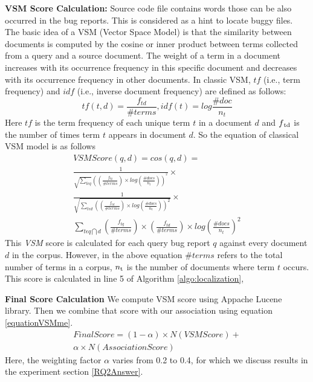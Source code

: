 \documentclass[conference]{IEEEtran}
\begin{document}
\textbf{VSM Score Calculation:}
Source code file contains words those can be also occurred in the bug reports. This is considered as a hint to locate buggy files. 
The basic idea of a VSM (Vector Space Model) is that the similarity between documents is computed by the cosine or inner product between terms collected from a query and a source document.
The weight of a term in a document increases with its occurrence frequency in this specific document and decreases with its occurrence frequency in other documents.
In classic VSM, {$tf$} (i.e., term frequency) and {$idf$} (i.e., inverse document frequency) are defined as follows:
\begin{equation}
tf(t,d)=\frac{f_{td}}{\#terms}, idf(t)=log\frac{\#doc}{n_{t}}
\end{equation}
Here $tf$ is the term frequency of each unique term {$t$} in a document {$d$} and {$f\textsubscript{td}$} is the number of times term {$t$} appears in document {$d$}.
So the equation of classical VSM model is as follows
\begin{multline}\label{VSMequation}
VSMScore(q,d)= cos(q,d) =
\\
\frac{1}{\sqrt{\sum_{t\epsilon q}}((\frac{f_{tq}}{\#terms})\times log(\frac{\#docs}{n_{t}}))^{^{2}}}\times 
\\
\frac{1}{\sqrt{\sum_{t\epsilon d}((\frac{f_{td}}{\#terms})\times log(\frac{\#docs}{n_{t}}))^{2}}}\times
\\
\sum_{t\epsilon q\bigcap d}(\frac{f_{tq}}{\#terms})\times (\frac{f_{td}}{\#terms})\times log(\frac{\#docs}{n_{t}})^{2}
\end{multline}
This \textit{VSM} score is calculated for each query bug report {$q$} against every document {$d$} in the corpus. However, in the above equation {$\#terms$} refers to the total number of terms in a corpus, {$n\textsubscript{t}$} is the number of documents where term {$t$} occurs. This score is calculated in line 5 of Algorithm \ref{algo:localization},




\textbf{Final Score Calculation}
We compute VSM score using Appache Lucene library. Then we combine that score with our association using equation \ref{equationVSMme}.
\begin{multline}\label{equationVSMme}
FinalScore=(1-\alpha )\times N(VSMScore)+ \\
\alpha \times N(AssociationScore)
\end{multline}
Here, the weighting factor $\alpha$ varies from 0.2 to 0.4, for which we discuss results in the experiment section \ref{RQ2Answer}. 
\end{document}
